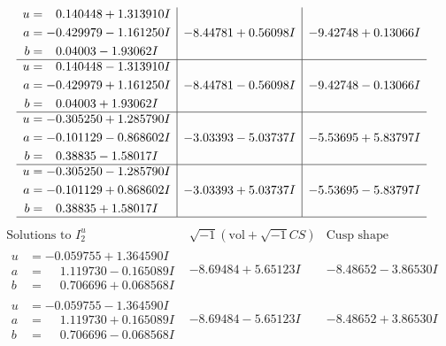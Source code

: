 \documentclass[1p]{elsarticle_modified}
\theoremstyle{definition}
\newcommand{\I}{\sqrt{-1}}
\begin{document}
$$\begin{array}{c|c|c}
\begin{aligned}
u &= \phantom{-}0.140448 + 1.313910 I \\
a &= -0.429979 - 1.161250 I \\
b &= \phantom{-}0.04003 - 1.93062 I\end{aligned}
 & -8.44781 + 0.56098 I & -9.42748 + 0.13066 I \\ \hline\begin{aligned}
u &= \phantom{-}0.140448 - 1.313910 I \\
a &= -0.429979 + 1.161250 I \\
b &= \phantom{-}0.04003 + 1.93062 I\end{aligned}
 & -8.44781 - 0.56098 I & -9.42748 - 0.13066 I \\ \hline\begin{aligned}
u &= -0.305250 + 1.285790 I \\
a &= -0.101129 - 0.868602 I \\
b &= \phantom{-}0.38835 - 1.58017 I\end{aligned}
 & -3.03393 - 5.03737 I & -5.53695 + 5.83797 I \\ \hline\begin{aligned}
u &= -0.305250 - 1.285790 I \\
a &= -0.101129 + 0.868602 I \\
b &= \phantom{-}0.38835 + 1.58017 I\end{aligned}
 & -3.03393 + 5.03737 I & -5.53695 - 5.83797 I\\
 \hline 
 \end{array}$$\newpage$$\begin{array}{c|c|c}  
\text{Solutions to }I^u_{2}& \I (\text{vol} + \sqrt{-1}CS) & \text{Cusp shape}\\
 \hline 
\begin{aligned}
u &= -0.059755 + 1.364590 I \\
a &= \phantom{-}1.119730 - 0.165089 I \\
b &= \phantom{-}0.706696 + 0.068568 I\end{aligned}
 & -8.69484 + 5.65123 I & -8.48652 - 3.86530 I \\ \hline\begin{aligned}
u &= -0.059755 - 1.364590 I \\
a &= \phantom{-}1.119730 + 0.165089 I \\
b &= \phantom{-}0.706696 - 0.068568 I\end{aligned}
 & -8.69484 - 5.65123 I & -8.48652 + 3.86530 I \\ \hline\begin{aligned}

\end{aligned}
\end{array}$$
\end{document}
